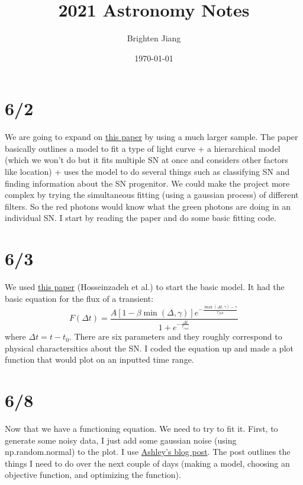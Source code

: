 \documentclass[12pt]{article}
\title{2021 Astronomy Notes}
\date{\today}
\author{Brighten Jiang}
\begin{document}
\maketitle

\tableofcontents

\section{6/2}
We are going to expand on \href{https://sci-hub.do/10.1088/0004-637X/799/2/208}{this paper} by using a much larger sample. The paper basically outlines a model to fit a type of light curve + a hierarchical model (which we won't do but it fits multiple SN at once and considers other factors like location) + uses the model to do several things such as classifying SN and finding information about the SN progenitor. We could make the project more complex by trying the simultaneous fitting (using a gaussian process) of different filters. So the red photons would know what the green photons are doing in an individual SN. I start by reading the paper and do some basic fitting code.

\section{6/3}
We used \href{https://arxiv.org/pdf/2008.04912.pdf}{this paper} (Hosseinzadeh et al.) to start the basic model. It had the basic equation for the flux of a transient: 
\begin{equation}
        F(\Delta t) = \frac{A [1 - \beta \min(\Delta, \gamma)]e^{-\frac{\max(\Delta t, \gamma) - \gamma}{\tau_{fall}}}}{1 + e^{-\frac{\Delta t}{\tau_{rise}}}} 
        \label{eq:flux}
\end{equation}
where $\Delta t = t - t_0.$ There are six parameters and they roughly correspond to physical charactersitics about the SN. I coded the equation up and made a plot function that would plot on an inputted time range.

\section{6/8}
Now that we have a functioning equation. We need to try to fit it. First, to generate some noisy data, I just add some gaussian noise (using np.random.normal) to the plot. I use \href{http://ashleyvillar.com/journal/2017/04/23/Fitting-Models-with-Moo/}{Ashley's blog post}. The post outlines the things I need to do over the next couple of days (making a model, choosing an objective function, and optimizing the function). 
\end{document}
